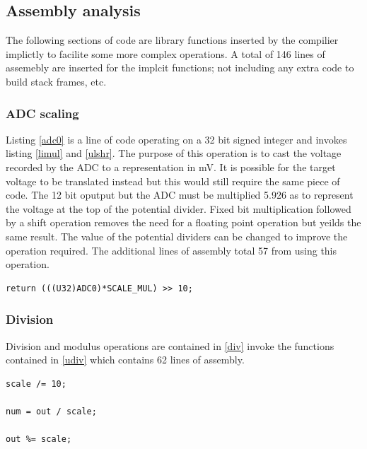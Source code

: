 \documentclass[12pt]{article}%
\begin{document}
\subsection{Assembly analysis}

The following sections of code are library functions inserted by the compilier implictly to facilite some more complex operations. A total of 146 lines of assemebly are inserted for the implcit functions; not including any extra code to build stack frames, etc.

\subsubsection{ADC scaling}

Listing \ref{adc0} is a line of code operating on a 32 bit signed integer and invokes listing \ref{limul} and \ref{ulshr}. The purpose of this operation is to cast the voltage recorded by the ADC to a representation in mV. It is possible for the target voltage to be translated instead but this would still require the same piece of code. The 12 bit oputput but the ADC must be multiplied 5.926 as to represent the voltage at the top of the potential divider. Fixed bit multiplication followed by a shift operation removes the need for a floating point operation but yeilds the same result. The value of the potential dividers can be changed to improve the operation required. The additional lines of assembly total 57 from using this operation.

\begin{lstlisting}
return (((U32)ADC0)*SCALE_MUL) >> 10;
\end{lstlisting}







\subsubsection{Division}

Division and modulus operations are contained in \ref{div} invoke the functions contained in \ref{udiv} which contains 62 lines of assembly. 

\begin{lstlisting}
scale /= 10;

num = out / scale;

out %= scale;	
\end{lstlisting}
\end{document}
